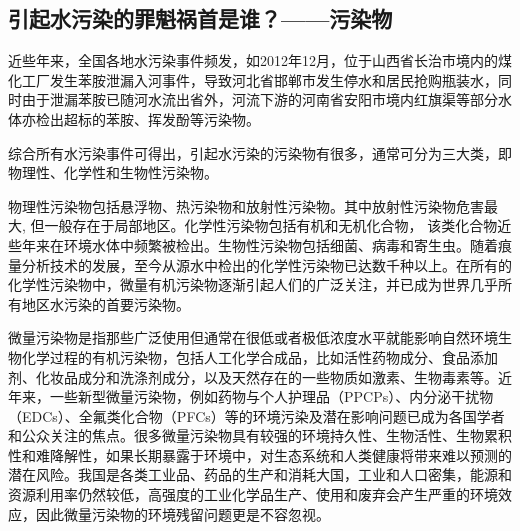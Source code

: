 \documentclass[
]{book}
\begin{document}
\hypertarget{ux5f15ux8d77ux6c34ux6c61ux67d3ux7684ux7f6aux9b41ux7978ux9996ux662fux8c01ux6c61ux67d3ux7269}{%
\subsection{引起水污染的罪魁祸首是谁？------污染物}\label{ux5f15ux8d77ux6c34ux6c61ux67d3ux7684ux7f6aux9b41ux7978ux9996ux662fux8c01ux6c61ux67d3ux7269}}

近些年来，全国各地水污染事件频发，如2012年12月，位于山西省长治市境内的煤化工厂发生苯胺泄漏入河事件，导致河北省邯郸市发生停水和居民抢购瓶装水，同时由于泄漏苯胺已随河水流出省外，河流下游的河南省安阳市境内红旗渠等部分水体亦检出超标的苯胺、挥发酚等污染物。

综合所有水污染事件可得出，引起水污染的污染物有很多，通常可分为三大类，即物理性、化学性和生物性污染物。

物理性污染物包括悬浮物、热污染物和放射性污染物。其中放射性污染物危害最大, 但一般存在于局部地区。化学性污染物包括有机和无机化合物， 该类化合物近些年来在环境水体中频繁被检出。生物性污染物包括细菌、病毒和寄生虫。随着痕量分析技术的发展，至今从源水中检出的化学性污染物已达数千种以上。在所有的化学性污染物中，微量有机污染物逐渐引起人们的广泛关注，并已成为世界几乎所有地区水污染的首要污染物。

微量污染物是指那些广泛使用但通常在很低或者极低浓度水平就能影响自然环境生物化学过程的有机污染物，包括人工化学合成品，比如活性药物成分、食品添加剂、化妆品成分和洗涤剂成分，以及天然存在的一些物质如激素、生物毒素等。近年来，一些新型微量污染物，例如药物与个人护理品（PPCPs）、内分泌干扰物（EDCs）、全氟类化合物（PFCs）等的环境污染及潜在影响问题已成为各国学者和公众关注的焦点。很多微量污染物具有较强的环境持久性、生物活性、生物累积性和难降解性，如果长期暴露于环境中，对生态系统和人类健康将带来难以预测的潜在风险。我国是各类工业品、药品的生产和消耗大国，工业和人口密集，能源和资源利用率仍然较低，高强度的工业化学品生产、使用和废弃会产生严重的环境效应，因此微量污染物的环境残留问题更是不容忽视。
\end{document}
